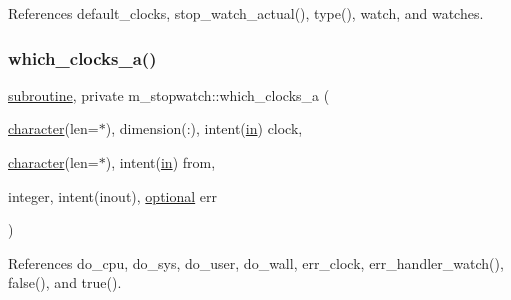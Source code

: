 References default\+\_\+clocks, stop\+\_\+watch\+\_\+actual(), type(), watch, and watches.

\mbox{\label{namespacem__stopwatch_a38967ac58362f42dc3c5cc27acbdb24f}} 
\subsubsection{\texorpdfstring{which\+\_\+clocks\+\_\+a()}{which\_clocks\_a()}}
{\footnotesize\ttfamily \hyperlink{M__stopwatch_83_8txt_acfbcff50169d691ff02d4a123ed70482}{subroutine}, private m\+\_\+stopwatch\+::which\+\_\+clocks\+\_\+a (\begin{DoxyParamCaption}\item[{\hyperlink{option__stopwatch_83_8txt_abd4b21fbbd175834027b5224bfe97e66}{character}(len=$\ast$), dimension(\+:), intent(\hyperlink{M__journal_83_8txt_afce72651d1eed785a2132bee863b2f38}{in})}]{clock,  }\item[{\hyperlink{option__stopwatch_83_8txt_abd4b21fbbd175834027b5224bfe97e66}{character}(len=$\ast$), intent(\hyperlink{M__journal_83_8txt_afce72651d1eed785a2132bee863b2f38}{in})}]{from,  }\item[{integer, intent(inout), \hyperlink{option__stopwatch_83_8txt_aa4ece75e7acf58a4843f70fe18c3ade5}{optional}}]{err }\end{DoxyParamCaption})\hspace{0.3cm}{\ttfamily [private]}}



References do\+\_\+cpu, do\+\_\+sys, do\+\_\+user, do\+\_\+wall, err\+\_\+clock, err\+\_\+handler\+\_\+watch(), false(), and true().

\mbox{\label{namespacem__stopwatch_a2438913aaa1966dfa18811ff048d642b}} 
